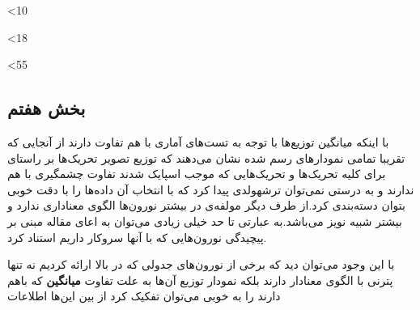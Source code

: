\documentclass[12pt,onecolumn,a4paper,fleqn]{article}
\begin{document}
		 \begin{figure}[ht]
		 	\centering
			\hfill
		 \end{figure}
		 
		 \addtocounter{int}{1}\ifnum\value{int}<10
		 \repeat
		 
		 
		 \loop
		 
		 \begin{figure}[h]
		 	\centering
		 	\hfill
		 \end{figure}
		 
		 
		 \addtocounter{int}{1}\ifnum\value{int}<18
		 \repeat
		 
		 \clearpage
		 
		 \loop
		 
		 
		 \begin{figure}[h]
		 	\centering
		 	\hfill
		 \end{figure}	 	     

		 
		 \addtocounter{int}{1}\ifnum\value{int}<55
		 \repeat 
		 
		 
		 \clearpage
		 
		\subsection{بخش هفتم}
	با اینکه میانگین توزیع‌ها با توجه به تست‌های آماری با هم تفاوت دارند از آنجایی که تقریبا تمامی نمودار‌های رسم شده نشان می‌دهند که توزیع تصویر تحریک‌ها بر راستای  برای کلیه تحریک‌ها و تحریک‌هایی که موجب اسپایک شدند تفاوت چشمگیری با هم ندارند و به درستی نمی‌توان ترشهولدی پیدا کرد که با انتخاب آن داده‌ها را با دقت خوبی بتوان دسته‌بندی کرد.از طرف دیگر مولفه‌ی  در بیشتر نورون‌ها الگوی‌ معناداری ندارد و بیشتر شبیه نویز‌ می‌باشد.به عبارتی تا حد خیلی زیادی می‌توان به اعای مقاله مبنی بر پیچیدگی نور‌ون‌هایی که با آنها سروکار داریم استناد کرد.
	
	با این وجود می‌توان دید که برخی از نورون‌های جدولی که در بالا ارائه کردیم نه تنها پترنی با الگوی معنادار دارند بلکه نمودار توزیع آن‌ها به علت تفاوت \textbf{میانگین} که باهم دارند را به خوبی می‌توان تفکیک کرد از بین این‌ها اطلاعات 
		
		 
		 
		 
		
\end{document}
